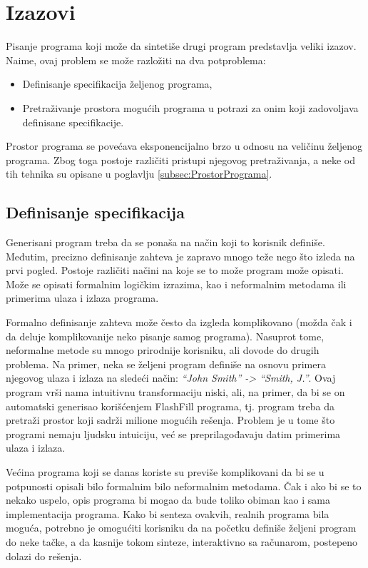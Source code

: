 \section{Izazovi}
\label{sec:Izazovi}

Pisanje programa koji može da sintetiše drugi program predstavlja veliki izazov. Naime, ovaj problem se može razložiti na dva potproblema:

\begin{itemize}
  \item Definisanje specifikacija željenog programa,
  \item Pretraživanje prostora mogućih programa u potrazi za onim koji zadovoljava definisane specifikacije.
\end{itemize}

Prostor programa se povećava eksponencijalno brzo u odnosu na veličinu željenog programa. Zbog toga postoje različiti pristupi njegovog pretraživanja, a neke od tih tehnika su opisane u poglavlju \ref{subsec:ProstorPrograma}. 

\subsection{Definisanje specifikacija}
\label{subsec:DefinisanjeSpecifikacija}

Generisani program treba da se ponaša na način koji to korisnik definiše. Međutim, precizno definisanje zahteva je zapravo mnogo teže nego što izleda na prvi pogled. Postoje različiti načini na koje se to može program može opisati. Može se opisati formalnim logičkim izrazima, kao i neformalnim metodama ili primerima ulaza i izlaza programa.

Formalno definisanje zahteva može često da izgleda komplikovano (možda čak i da deluje komplikovanije neko pisanje samog programa). Nasuprot tome, neformalne metode su mnogo prirodnije korisniku, ali dovode do drugih problema. Na primer, neka se željeni program definiše na osnovu primera njegovog ulaza i izlaza na sledeći način: \emph{“John Smith” -> “Smith, J.”}. Ovaj program vrši nama intuitivnu transformaciju niski, ali, na primer, da bi se on automatski generisao korišćenjem FlashFill \cite{FlashFill} programa, tj. program treba da pretraži prostor koji sadrži milione mogućih rešenja. Problem je u tome što programi nemaju ljudsku intuiciju, već se preprilagođavaju datim primerima ulaza i izlaza.

Većina programa koji se danas koriste su previše komplikovani da bi se u potpunosti opisali bilo formalnim bilo neformalnim metodama. Čak i ako bi se to nekako uspelo, opis programa bi mogao da bude toliko obiman kao i sama implementacija programa. Kako bi senteza ovakvih, realnih programa bila moguća, potrebno je omogućiti korisniku da na početku definiše željeni program do neke tačke, a da kasnije tokom sinteze, interaktivno sa računarom, postepeno dolazi do rešenja.

